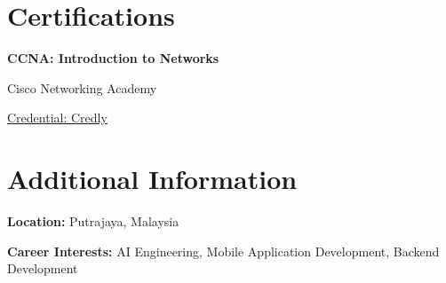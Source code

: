\documentclass[10pt,a4paper]{article}
\begin{document}
\section{Certifications}

\textbf{CCNA: Introduction to Networks}

Cisco Networking Academy

\href{https://www.credly.com/badges/23683cbb-eba2-4fcf-9503-cd4e13f1312c}
{Credential: Credly}

\section{Additional Information}

\textbf{Location:} Putrajaya, Malaysia

\textbf{Career Interests:} AI Engineering, Mobile Application Development,
Backend Development
\end{document}
